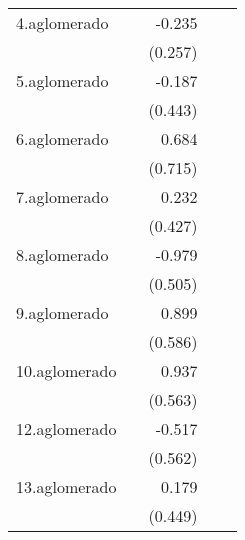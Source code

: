 {\begin{longtable}{l*{4}{D{.}{.}{-1}}}
\addlinespace
4.aglomerado&                     &      -0.235         &                     &                     \\
            &                     &     (0.257)         &                     &                     \\
\addlinespace
5.aglomerado&                     &      -0.187         &                     &                     \\
            &                     &     (0.443)         &                     &                     \\
\addlinespace
6.aglomerado&                     &       0.684         &                     &                     \\
            &                     &     (0.715)         &                     &                     \\
\addlinespace
7.aglomerado&                     &       0.232         &                     &                     \\
            &                     &     (0.427)         &                     &                     \\
\addlinespace
8.aglomerado&                     &      -0.979         &                     &                     \\
            &                     &     (0.505)         &                     &                     \\
\addlinespace
9.aglomerado&                     &       0.899         &                     &                     \\
            &                     &     (0.586)         &                     &                     \\
\addlinespace
10.aglomerado&                     &       0.937         &                     &                     \\
            &                     &     (0.563)         &                     &                     \\
\addlinespace
12.aglomerado&                     &      -0.517         &                     &                     \\
            &                     &     (0.562)         &                     &                     \\
\addlinespace
13.aglomerado&                     &       0.179         &                     &                     \\
            &                     &     (0.449)         &                     &                     \\

\end{longtable}}
